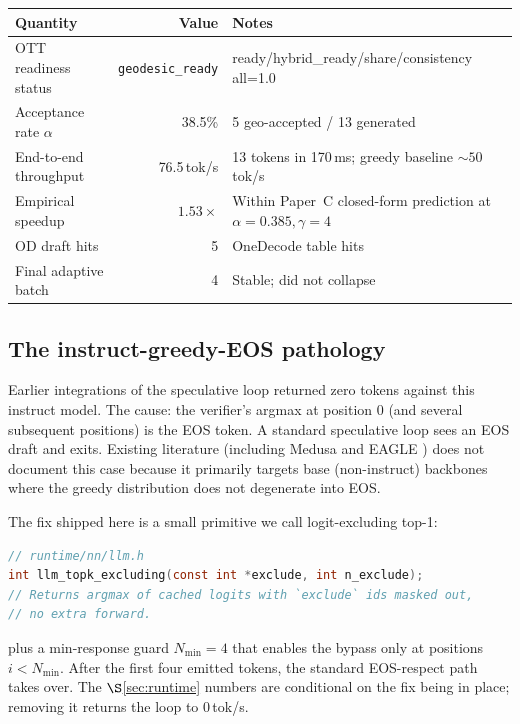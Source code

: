 \documentclass[11pt]{article}
\begin{document}
\begin{table}[h]
\centering\small
\begin{tabular}{lrl}
\toprule
Quantity & Value & Notes\\
\midrule
OTT readiness status & \texttt{geodesic\_ready} & ready/hybrid\_ready/share/consistency all=1.0\\
Acceptance rate $\alpha$ & 38.5\% & 5 geo-accepted / 13 generated\\
End-to-end throughput & 76.5\,tok/s & 13 tokens in 170\,ms; greedy baseline $\sim\!50$\,tok/s\\
Empirical speedup & $1.53\times$ & Within Paper~C closed-form prediction at $\alpha=0.385,\gamma=4$\\
OD draft hits & 5 & OneDecode table hits\\
Final adaptive batch & 4 & Stable; did not collapse\\
\bottomrule
\end{tabular}
\end{table}

\subsection{The instruct-greedy-EOS pathology}

Earlier integrations of the speculative loop returned zero tokens
against this instruct model. The cause: the verifier's argmax at position 0
(and several subsequent positions) is the EOS token. A standard speculative
loop \cite{leviathan2023fast,chen2023accelerating} sees an EOS draft and
exits. Existing literature (including Medusa \cite{cai2024medusa} and
EAGLE \cite{li2024eagle}) does not document this case because it primarily
targets base (non-instruct) backbones where the greedy distribution does not
degenerate into EOS.

The fix shipped here is a small primitive we call logit-excluding
top-1:
\begin{lstlisting}[language=C]
// runtime/nn/llm.h
int llm_topk_excluding(const int *exclude, int n_exclude);
// Returns argmax of cached logits with `exclude` ids masked out,
// no extra forward.
\end{lstlisting}
plus a min-response guard $N_{\min}=4$ that enables the bypass only at
positions $i<N_{\min}$. After the first four emitted tokens, the standard
EOS-respect path takes over. The $\S$\ref{sec:runtime} numbers are
conditional on the fix being in place; removing it returns the loop to
0\,tok/s.
\end{document}
